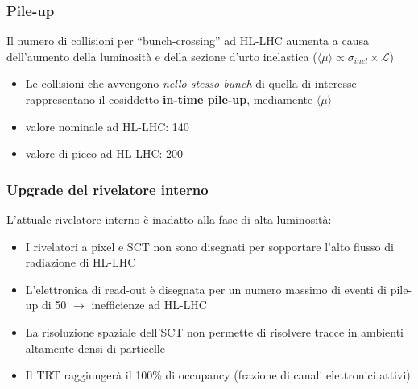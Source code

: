 \documentclass{beamer}
\begin{document}
\begin{frame}[t]
\frametitle{Pile-up}
Il numero di collisioni per ``bunch-crossing'' ad HL-LHC aumenta
a causa dell'aumento della luminosit\`a e della sezione d'urto inelastica 
($\langle\mu\rangle \propto \sigma_{inel} \times \mathcal{L}$)\\

\begin{itemize}
\item Le collisioni che avvengono \textit{nello stesso bunch} di quella di interesse
rappresentano il cosiddetto \textbf{in-time pile-up}, mediamente $\langle\mu\rangle$
\item valore nominale ad HL-LHC: 140
\item valore di picco ad HL-LHC: 200
\end{itemize}




\end{frame}


\begin{frame}
\frametitle{Upgrade del rivelatore interno}
L'attuale rivelatore interno \`e inadatto alla fase di alta luminosit\`a:
\pause
\begin{itemize}
\item<+-> I rivelatori a pixel e SCT non sono disegnati per sopportare l'alto
flusso di radiazione di HL-LHC
\item<+-> L'elettronica di read-out \`e disegnata per un numero massimo di eventi
		di pile-up di 50 $\rightarrow$ inefficienze ad HL-LHC
\item<+-> La risoluzione spaziale dell'SCT non permette di risolvere tracce
		in ambienti altamente densi di particelle
\item<+-> Il TRT raggiunger\`a il 100\% di occupancy (frazione di canali elettronici attivi)
\end{itemize}

\bigskip


\end{frame}
\end{document}
